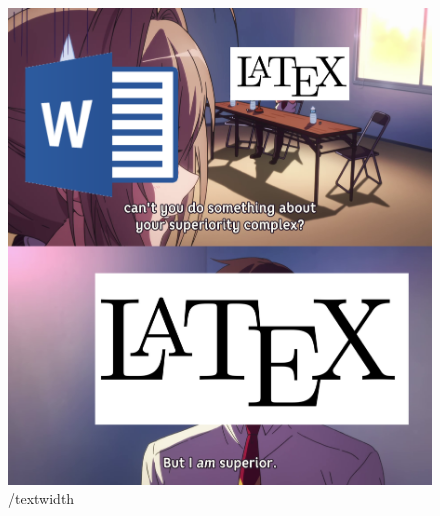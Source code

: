 \documentclass[12pt]{article}
\begin{document}
	\begin{figure}
		\centering
		\includegraphics[width=\textwidth]{meme_superior.png}
		\caption{\slash textwidth}
	\end{figure}
\end{document}
